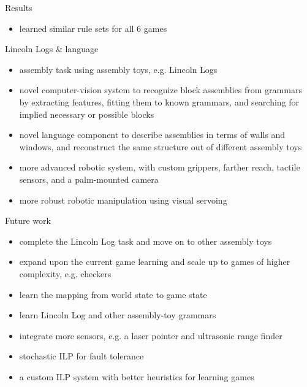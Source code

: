 \documentclass[final,t]{beamer}
\begin{document}
\begin{frame}[fragile]{}
\begin{columns}[t]
\begin{column}{.3\linewidth}
\begin{block}{Results}
\begin{itemize}
\begin{verbatim}
	\end{verbatim}
	\item learned similar rule sets for all 6 games
	\end{itemize}
      \end{block}

      \begin{block}{Lincoln Logs \& language}
	\begin{itemize}
	\item assembly task using assembly toys, e.g. Lincoln Logs
	\item novel computer-vision system to recognize block
	  assemblies from grammars by extracting features, fitting
	  them to known grammars, and searching for implied necessary
	  or possible blocks
	\item novel language component to describe assemblies in terms
	  of walls and windows, and reconstruct the same structure out
	  of different assembly toys
	\item more advanced robotic system, with custom grippers,
	  farther reach, tactile sensors, and a palm-mounted camera
	\item more robust robotic manipulation using visual servoing
	\end{itemize}
      \end{block}

      \begin{block}{Future work}
	\begin{itemize}
	\item complete the Lincoln Log task and move on to other
	  assembly toys
	\item expand upon the current game learning and scale
	  up to games of higher complexity, e.g. checkers
	\item learn the mapping from world state to game state
	\item learn Lincoln Log and other assembly-toy grammars
	\item integrate more sensors, e.g. a laser pointer and
	  ultrasonic range finder
	\item stochastic ILP for fault tolerance
	\item a custom ILP system with better heuristics for learning
	  games
	\end{itemize}
      \end{block}

    \end{column}
  \end{columns}
\end{frame}
\end{document}

